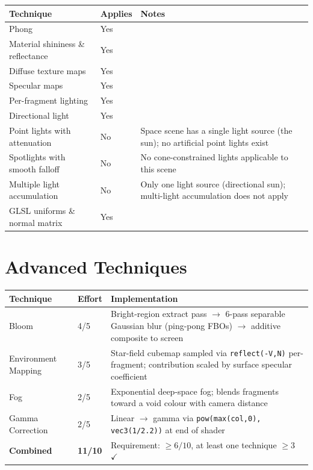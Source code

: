 \documentclass[11pt,a4paper]{article}
\begin{document}
\smallskip
\begin{tabular}{@{}p{5.8cm}p{1.6cm}p{7.6cm}@{}}
\toprule
Technique & Applies & Notes \\
\midrule
Phong  & Yes & \\
Material shininess \& reflectance    & Yes & \\
Diffuse texture maps                 & Yes & \\
Specular maps                        & Yes & \\
Per-fragment lighting                & Yes & \\
Directional light                    & Yes & \\
Point lights with attenuation        & No
  & Space scene has a single light source (the sun); no artificial point lights exist \\
Spotlights with smooth falloff       & No
  & No cone-constrained lights applicable to this scene \\
Multiple light accumulation          & No
  & Only one light source (directional sun); multi-light accumulation does not apply \\
GLSL uniforms \& normal matrix       & Yes & \\
\bottomrule
\end{tabular}

\section{Advanced Techniques}

\smallskip
\begin{tabular}{@{}p{4.2cm}p{1.2cm}p{9.6cm}@{}}
\toprule
Technique & Effort & Implementation \\
\midrule
Bloom & 4/5
  & Bright-region extract pass $\to$ 6-pass separable Gaussian
    blur (ping-pong FBOs) $\to$ additive composite to screen \\
Environment Mapping & 3/5
  & Star-field cubemap sampled via \texttt{reflect(-V,N)}
    per-fragment; contribution scaled by surface specular coefficient \\
Fog & 2/5
  & Exponential deep-space fog; blends fragments toward
    a void colour with camera distance \\
Gamma Correction & 2/5
  & Linear $\to$ gamma via \texttt{pow(max(col,0), vec3(1/2.2))}
    at end of shader \\
\midrule
\textbf{Combined} & \textbf{11/10}
  & Requirement: $\geq 6/10$, at least one technique $\geq 3$ \quad $\checkmark$ \\
\bottomrule
\end{tabular}
\end{document}
